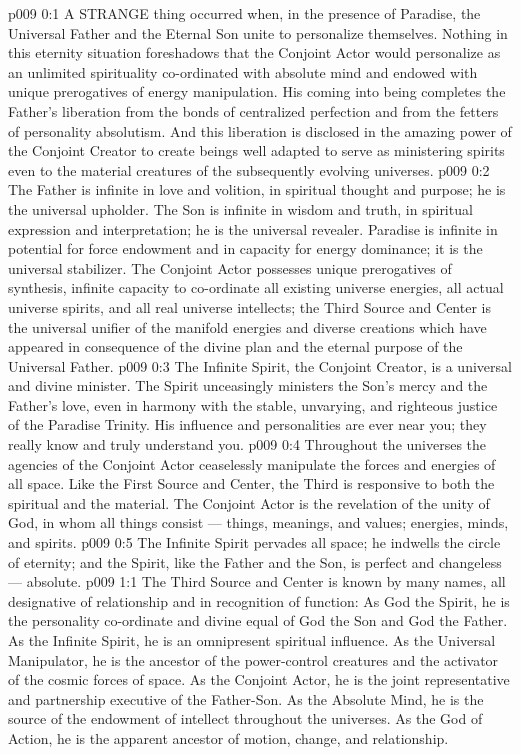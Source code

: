 \vs p009 0:1 A STRANGE thing occurred when, in the presence of Paradise, the Universal Father and the Eternal Son unite to personalize themselves. Nothing in this eternity situation foreshadows that the Conjoint Actor would personalize as an unlimited spirituality co\hyp{}ordinated with absolute mind and endowed with unique prerogatives of energy manipulation. His coming into being completes the Father’s liberation from the bonds of centralized perfection and from the fetters of personality absolutism. And this liberation is disclosed in the amazing power of the Conjoint Creator to create beings well adapted to serve as ministering spirits even to the material creatures of the subsequently evolving universes.
\vs p009 0:2 \pc The Father is infinite in love and volition, in spiritual thought and purpose; he is the universal upholder. The Son is infinite in wisdom and truth, in spiritual expression and interpretation; he is the universal revealer. Paradise is infinite in potential for force endowment and in capacity for energy dominance; it is the universal stabilizer. The Conjoint Actor possesses unique prerogatives of synthesis, infinite capacity to co\hyp{}ordinate all existing universe energies, all actual universe spirits, and all real universe intellects; the Third Source and Center is the universal unifier of the manifold energies and diverse creations which have appeared in consequence of the divine plan and the eternal purpose of the Universal Father.
\vs p009 0:3 The Infinite Spirit, the Conjoint Creator, is a universal and divine minister. The Spirit unceasingly ministers the Son’s mercy and the Father’s love, even in harmony with the stable, unvarying, and righteous justice of the Paradise Trinity. His influence and personalities are ever near you; they really know and truly understand you.
\vs p009 0:4 Throughout the universes the agencies of the Conjoint Actor ceaselessly manipulate the forces and energies of all space. Like the First Source and Center, the Third is responsive to both the spiritual and the material. The Conjoint Actor is the revelation of the unity of God, in whom all things consist --- things, meanings, and values; energies, minds, and spirits.
\vs p009 0:5 \pc The Infinite Spirit pervades all space; he indwells the circle of eternity; and the Spirit, like the Father and the Son, is perfect and changeless --- absolute.
\vs p009 1:1 The Third Source and Center is known by many names, all designative of relationship and in recognition of function: As God the Spirit, he is the personality co\hyp{}ordinate and divine equal of God the Son and God the Father. As the Infinite Spirit, he is an omnipresent spiritual influence. As the Universal Manipulator, he is the ancestor of the power\hyp{}control creatures and the activator of the cosmic forces of space. As the Conjoint Actor, he is the joint representative and partnership executive of the Father\hyp{}Son. As the Absolute Mind, he is the source of the endowment of intellect throughout the universes. As the God of Action, he is the apparent ancestor of motion, change, and relationship.
